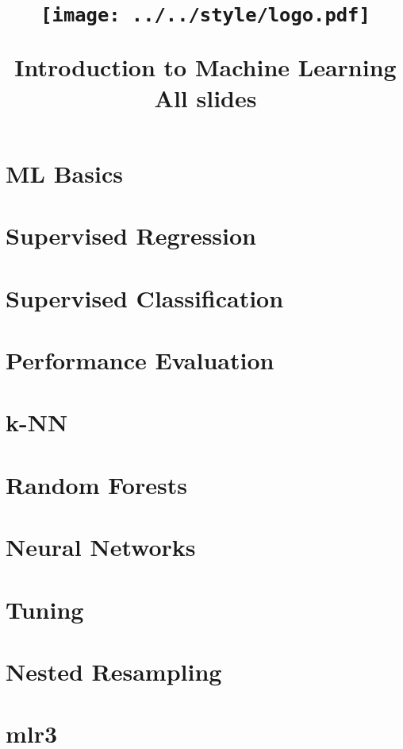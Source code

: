 \documentclass[11pt,compress]{beamer}
\title{
\centerline{\texttt{[image: ../../style/logo.pdf]}}
\medskip
Introduction to Machine Learning \\
\medskip
\small All slides
}
\begin{document}

\begin{frame}
\maketitle
\end{frame}



\section{ML Basics}


\section{Supervised Regression}


\section{Supervised Classification}


\section{Performance Evaluation}


\section{k-NN}


%

\section{Random Forests}


\section{Neural Networks}


\section{Tuning}


\section{Nested Resampling}


\section{mlr3}

\end{document}
